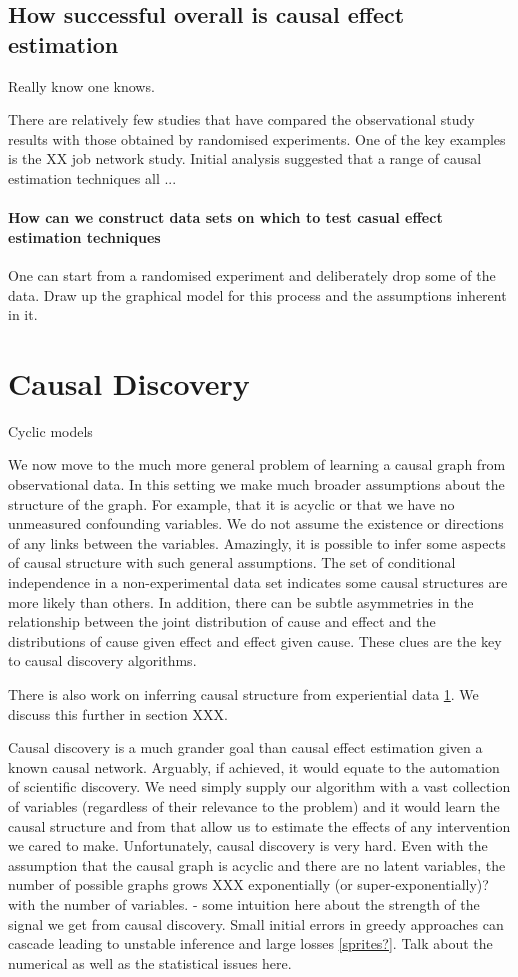\documentclass[11pt,a4paper,oneside]{book}
\theoremstyle{plain}
\theoremstyle{definition}
\begin{document}
\subsection{How successful overall is causal effect estimation}
Really know one knows.

There are relatively few studies that have compared the observational study results with those obtained by randomised experiments. One of the key examples is the XX job network study. Initial analysis suggested that a range of causal estimation techniques all ...

\paragraph*{How can we construct data sets on which to test casual effect estimation techniques}
One can start from a randomised experiment and deliberately drop some of the data. Draw up the graphical model for this process and the assumptions inherent in it. 

\section{Causal Discovery}

Cyclic models \cite{Hyttinen2012}

We now move to the much more general problem of learning a causal graph from observational data. In this setting we make much broader assumptions about the structure of the graph. For example, that it is acyclic or that we have no unmeasured confounding variables. We do not assume the existence or directions of any links between the variables. Amazingly, it is possible to infer some aspects of causal structure with such general assumptions. The set of conditional independence in a non-experimental data set indicates some causal structures are more likely than others. In addition, there can be subtle asymmetries in the relationship between the joint distribution of cause and effect and the distributions of cause given effect and effect given cause. These clues are the key to causal discovery algorithms.

There is also work on inferring causal structure from experiential data \ref{}. We discuss this further in section XXX.

Causal discovery is a much grander goal than causal effect estimation given a known causal network. Arguably, if achieved, it would equate to the automation of scientific discovery. We need simply supply our algorithm with a vast collection of variables (regardless of their relevance to the problem) and it would learn the causal structure and from that allow us to estimate the effects of any intervention we cared to make. Unfortunately, causal discovery is very hard. Even with the assumption that the causal graph is acyclic and there are no latent variables, the number of possible graphs grows XXX exponentially (or super-exponentially)? with the number of variables. - some intuition here about the strength of the signal we get from causal discovery. Small initial errors in greedy approaches can cascade leading to unstable inference and large losses \ref{sprites?}. Talk about the numerical as well as the statistical issues here. 
\end{document}
